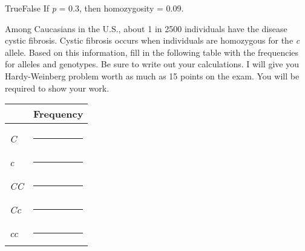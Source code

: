 \documentclass[letterpaper]{tufte-handout}
\begin{document}
\noindent True\hspace{1em}False\hspace{1em} If \textit{p} = 0.3, then homozygosity = 0.09.

\bigskip \bigskip

\noindent Among Caucasians in the U.S., about 1 in 2500 individuals have the disease cystic fibrosis. Cystic fibrosis occurs when individuals are homozygous for the \textit{c} allele. Based on this information, fill in the following table with the frequencies for alleles and genotypes. Be sure to write out your calculations. I will give you Hardy-Weinberg problem worth as much as 15 points on the exam. You will be required to show your work.

\bigskip

\begin{tabular}{@{}ll@{}}
\toprule
	& Frequency\tabularnewline
\midrule
	& \tabularnewline
\textit{C}	&	\rule{0.6in}{0.4pt}\tabularnewline[2em]
\textit{c}	&	\rule{0.6in}{0.4pt}\tabularnewline[2em]
\textit{CC}	&	\rule{0.6in}{0.4pt}\tabularnewline[2em]
\textit{Cc}	&	\rule{0.6in}{0.4pt}\tabularnewline[2em]
\textit{cc}	&	\rule{0.6in}{0.4pt}\tabularnewline
\bottomrule
\end{tabular}
\end{document}

